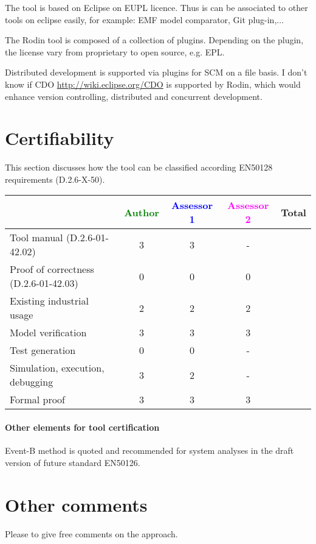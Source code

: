 \begin{author_comment}
The tool is based on Eclipse on EUPL licence. Thus is can be associated to  other tools on eclipse easily, for example: EMF model comparator, Git plug-in,...
\end{author_comment}

\begin{assessor2}
  The Rodin tool is composed of a collection of plugins. Depending on
  the plugin, the license vary from proprietary to open source,
  e.g. EPL.
\end{assessor2}

\begin{assessor2}
  Distributed development is supported via plugins for SCM on a file
  basis. I don't know if CDO \url{http://wiki.eclipse.org/CDO} is
  supported by Rodin, which would enhance version controlling,
  distributed and concurrent development.
\end{assessor2}

\section{Certifiability}

This section discusses how the tool can be classified according EN50128 requirements (D.2.6-X-50).


\begin{tabular}{|l | c | c | c | c|}
\hline
& \textcolor{green}{Author} & \textcolor{blue}{Assessor 1} & \textcolor{magenta}{Assessor 2} & Total \\
\hline 
Tool manual (D.2.6-01-42.02) & 3 & 3 & - &  \\
\hline
Proof of correctness (D.2.6-01-42.03)   & 0 & 0 & 0 & \\
\hline
Existing industrial usage  & 2 & 2 & 2 & \\
\hline
Model verification & 3 & 3 & 3 & \\
\hline
Test generation & 0 & 0 & - & \\
\hline
Simulation, execution, debugging & 3 & 2 & - & \\
\hline
Formal proof &3  & 3 & 3 & \\
\hline
\end{tabular}

\paragraph{Other elements for tool certification}

\begin{author_comment}
Event-B method is quoted and recommended for system analyses in the draft version of future standard EN50126.

\end{author_comment}

\section{Other comments}
Please to  give free comments on the approach.



